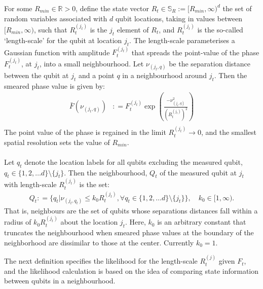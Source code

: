 \begin{defn} For some $R_{min} \in \mathbb{R} > 0$, define the state vector $R_t \in  \mathbb{S}_R := [R_{min}, \infty)^d$ the set of random variables associated with $d$ qubit locations, taking in values between $[R_{min}, \infty)$, such that $R_t^{(j_t)}$ is the $j_t$ element of $R_t$, and $R_t^{(j_t)}$ is the so-called `length-scale' for the qubit at location $j_t$. The length-scale parameterises a Gaussian function with amplitude $F_t^{(j_t)}$  that spreads the point-value of the phase $F_t^{(j_t)}$, at $j_t$, into a small neighbourhood. Let $\nu_{(j_t,q)}$ be the separation distance between the qubit at $j_t$ and a point $q$ in a neighbourhood around $j_t$. Then the smeared phase value is given by:
	\begin{align}
	\bar{F}(\nu_{(j_t,q)}) &: = F_t^{(j_t)} \exp\left( \frac{- \nu_{(j_t,q)}^2}{(R_t^{(j_t)})^2}\right) \label{qslam:defn:bar_F}\\
	\end{align}
The point value of the phase  is regained in the limit $R_t^{(j_t)} \to 0$, and the smallest spatial resolution sets the value of $R_{min}$.  \\
\\
Let $q_t$ denote the location labels for all qubits excluding the measured qubit, $ q_t \in \{1, 2, \hdots d \} \setminus \{j_t\} $. Then the neighbourhood, $Q_t$ of the measured qubit at $j_t$ with length-scale $R_t^{(j_t)}$ is the set:
\begin{align}
Q_t : = \{ q_t | \nu_{(j_t, q_t)} \leq k_0 R_t^{(j_t)}, \forall q_t \in \{1, 2, \hdots d \} \setminus \{j_t\} \}, \quad k_0 \in [1, \infty). \label{qslam:defn:Q_t} 
\end{align} That is, neighbours are the set of qubits whose separations distances fall within a radius of $k_0 R_t^{(j_t)}$ about the location $j_t$. Here, $k_0$ is an arbitrary constant that truncates the neighbourhood when smeared phase values at the boundary of the neighborhood are dissimilar to those at the center. Currently $k_0=1$.
\end{defn} 
The next definition specifies the likelihood for the length-scale $R_t^{(j)}$ given $F_t$, and the likelihood calculation is based on the idea of comparing state information between qubits in a neighbourhood. 
